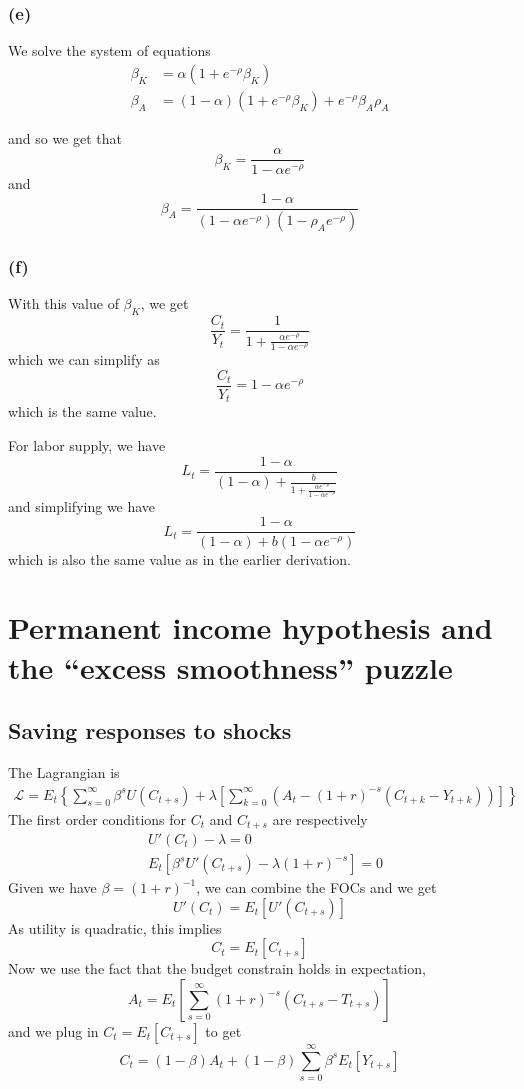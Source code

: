 \documentclass[11pt]{amsart}
\begin{document}
\subsubsection*{(e)}

We solve the system of equations
\begin{align*}
\beta_K &= \alpha (1+ e^{-\rho} \beta_K) \\
\beta_A &= (1-\alpha) (1+ e^{-\rho} \beta_K) + e^{-\rho} \beta_A \rho_A
\end{align*}

and so we get that 
\[
\beta_K = \frac{\alpha}{1-\alpha e^{-\rho}}
\]
and
\[
\beta_A = \frac{1-\alpha}{(1-\alpha e^{-\rho})(1-\rho_A e^{-\rho})}
\]

\subsubsection*{(f)}

With this value of $\beta_K$, we get
\[
\frac{C_t}{Y_t} = \frac{1}{1 + \frac{\alpha e^{-\rho}}{1-\alpha e^{-\rho}}}
\]
which we can simplify as
\[
\frac{C_t}{Y_t} = 1-\alpha e^{-\rho}
\]
which is the same value.

For labor supply, we have
\[
L_t = \frac{1-\alpha}{(1-\alpha) + \frac{b}{1+ \frac{\alpha e^{-\rho}}{1-\alpha e^{-\rho}}}}
\]
and simplifying we have
\[
L_t = \frac{1-\alpha}{(1-\alpha) + b (1-\alpha e^{-\rho})}
\]
which is also the same value as in the earlier derivation.

\section{Permanent income hypothesis and the ``excess smoothness'' puzzle}

\subsection{Saving responses to shocks}
The Lagrangian is
\begin{align*}
	\mathcal{L} = E_t \left\lbrace \sum_{s=0}^\infty \beta^s U(C_{t+s}) + \lambda \left[ \sum_{k=0}^\infty \left( A_t - (1+r)^{-s} (C_{t+k} - Y_{t+k} ) \right) \right]\right\rbrace
\end{align*}
The first order conditions for $C_t$ and $C_{t+s}$ are respectively
\begin{align*}
	&U'(C_t) - \lambda = 0 \\
	&E_t \left[ \beta^s U'(C_{t+s}) -\lambda (1+r)^{-s} \right] = 0
\end{align*}
Given we have $\beta = (1+r)^{-1}$, we can combine the FOCs and we get
\[
U'(C_t) = E_t \left[ U'(C_{t+s}) \right]
\]
As utility is quadratic, this implies
\[
C_t = E_t \left[ C_{t+s} \right]
\]
Now we use the fact that the budget constrain holds in expectation,
\[
A_t = E_t \left[ \sum_{s=0}^\infty (1+r)^{-s} (C_{t+s} - T_{t+s}) \right]
\]
and we plug in $C_t = E_t \left[ C_{t+s} \right]$ to get
\[
C_t = (1-\beta) A_t + (1-\beta) \sum_{s=0}^\infty \beta^s E_t [Y_{t+s}]
\]
\end{document}
